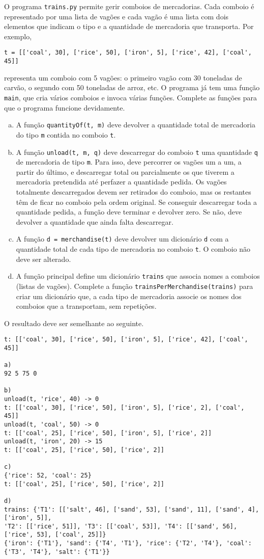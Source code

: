 \documentclass{article}
\renewcommand{\j}[1]{\texttt{#1}}
\begin{document}
O programa \j{trains.py} permite gerir comboios de mercadorias.
Cada comboio é representado por uma lista de vagões e
cada vagão é uma lista com dois elementos que indicam
o tipo e a quantidade de mercadoria que transporta.
Por exemplo,
\begin{verbatim}
t = [['coal', 30], ['rice', 50], ['iron', 5], ['rice', 42], ['coal', 45]]
\end{verbatim}
representa um comboio com 5 vagões:
o primeiro vagão com 30 toneladas de carvão,
o segundo com 50 toneladas de arroz, etc.
O programa já tem uma função \j{main},
que cria vários comboios e invoca várias funções.
Complete as funções para que o programa funcione devidamente.
\begin{enumerate}[a)]
\item
A função \j{quantityOf(t, m)}
deve devolver a quantidade total de mercadoria do tipo \j{m}
contida no comboio \j{t}.

\item
A função \j{unload(t, m, q)}
deve descarregar do comboio \j{t} uma quantidade \j{q}
de mercadoria de tipo \j{m}.
Para isso, deve percorrer os vagões um a um, a partir do último,
e descarregar total ou parcialmente os que tiverem a mercadoria pretendida
até perfazer a quantidade pedida.
Os vagões totalmente descarregados devem ser retirados do comboio,
mas os restantes têm de ficar no comboio pela ordem original.
Se conseguir descarregar toda a quantidade pedida,
a função deve terminar e devolver zero.
Se não, deve devolver a quantidade que ainda falta descarregar.

\item
A função \j{d = merchandise(t)}
deve devolver um dicionário \j{d} com a quantidade total de cada
tipo de mercadoria no comboio \j{t}.
O comboio não deve ser alterado.

\item
A função principal define um dicionário \j{trains}
que associa nomes a comboios (listas de vagões).
Complete a função \j{trainsPerMerchandise(trains)}
para criar um dicionário que,
a cada tipo de mercadoria associe os nomes dos comboios que a transportam,
sem repetições.

\end{enumerate}
O resultado deve ser semelhante ao seguinte.
{\footnotesize
\begin{verbatim}
t: [['coal', 30], ['rice', 50], ['iron', 5], ['rice', 42], ['coal', 45]]

a)
92 5 75 0

b)
unload(t, 'rice', 40) -> 0
t: [['coal', 30], ['rice', 50], ['iron', 5], ['rice', 2], ['coal', 45]]
unload(t, 'coal', 50) -> 0
t: [['coal', 25], ['rice', 50], ['iron', 5], ['rice', 2]]
unload(t, 'iron', 20) -> 15
t: [['coal', 25], ['rice', 50], ['rice', 2]]

c)
{'rice': 52, 'coal': 25}
t: [['coal', 25], ['rice', 50], ['rice', 2]]

d)
trains: {'T1': [['salt', 46], ['sand', 53], ['sand', 11], ['sand', 4], ['iron', 5]],
'T2': [['rice', 51]], 'T3': [['coal', 53]], 'T4': [['sand', 56], ['rice', 53], ['coal', 25]]}
{'iron': {'T1'}, 'sand': {'T4', 'T1'}, 'rice': {'T2', 'T4'}, 'coal': {'T3', 'T4'}, 'salt': {'T1'}}
\end{verbatim}
}
\end{document}
